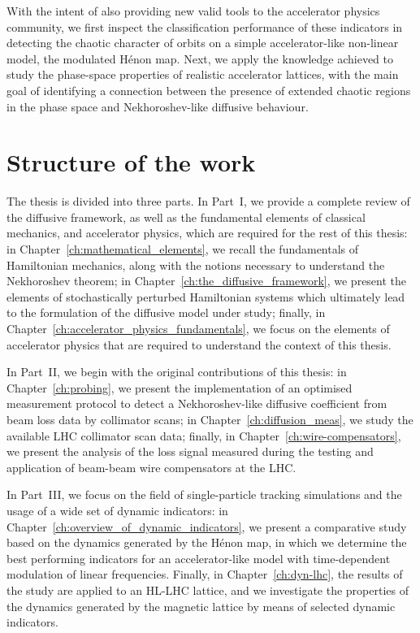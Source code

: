 With the intent of also providing new valid tools to the accelerator physics community, we first inspect the classification performance of these indicators in detecting the chaotic character of orbits on a simple accelerator-like non-linear model, the modulated Hénon map. Next, we apply the knowledge achieved to study the phase-space properties of realistic accelerator lattices, with the main goal of identifying a connection between the presence of extended chaotic regions in the phase space and Nekhoroshev-like diffusive behaviour.

\section*{Structure of the work}

The thesis is divided into three parts. In Part~I, we provide a complete review of the diffusive framework, as well as the fundamental elements of classical mechanics, and accelerator physics, which are required for the rest of this thesis: in Chapter~\ref{ch:mathematical_elements}, we recall the fundamentals of Hamiltonian mechanics, along with the notions necessary to understand the Nekhoroshev theorem; in Chapter~\ref{ch:the_diffusive_framework}, we present the elements of stochastically perturbed Hamiltonian systems which ultimately lead to the formulation of the diffusive model under study; finally, in Chapter~\ref{ch:accelerator_physics_fundamentals}, we focus on the elements of accelerator physics that are required to understand the context of this thesis.

In Part~II, we begin with the original contributions of this thesis: in Chapter~\ref{ch:probing}, we present the implementation of an optimised measurement protocol to detect a Nekhoroshev-like diffusive coefficient from beam loss data by collimator scans; in Chapter~\ref{ch:diffusion_meas}, we study the available LHC collimator scan data; finally, in Chapter~\ref{ch:wire-compensators}, we present the analysis of the loss signal measured during the testing and application of beam-beam wire compensators at the LHC.

In Part~III, we focus on the field of single-particle tracking simulations and the usage of a wide set of dynamic indicators: in Chapter~\ref{ch:overview_of_dynamic_indicators}, we present a comparative study based on the dynamics generated by the Hénon map, in which we determine the best performing indicators for an accelerator-like model with time-dependent modulation of linear frequencies. Finally, in Chapter~\ref{ch:dyn-lhc}, the results of the study are applied to an HL-LHC lattice, and we investigate the properties of the dynamics generated by the magnetic lattice by means of selected dynamic indicators.


